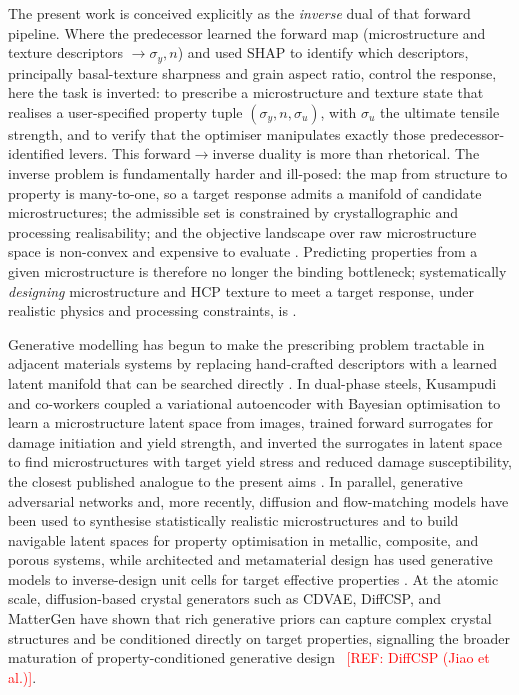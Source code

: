 \documentclass[preprint,12pt]{elsarticle}
\newcommand{\refneeded}[1]{\textcolor{red}{[REF: #1]}} %
\begin{document}
The present work is conceived explicitly as the \emph{inverse} dual of that forward pipeline. Where the predecessor learned the forward map (microstructure and texture descriptors $\rightarrow \sigma_y, n$) and used SHAP to identify which descriptors, principally basal-texture sharpness and grain aspect ratio, control the response, here the task is inverted: to prescribe a microstructure and texture state that realises a user-specified property tuple $(\sigma_y, n, \sigma_u)$, with $\sigma_u$ the ultimate tensile strength, and to verify that the optimiser manipulates exactly those predecessor-identified levers. This forward$\rightarrow$inverse duality is more than rhetorical. The inverse problem is fundamentally harder and ill-posed: the map from structure to property is many-to-one, so a target response admits a manifold of candidate microstructures; the admissible set is constrained by crystallographic and processing realisability; and the objective landscape over raw microstructure space is non-convex and expensive to evaluate \cite{GENERALE2024119877}. Predicting properties from a given microstructure is therefore no longer the binding bottleneck; systematically \emph{designing} microstructure and HCP texture to meet a target response, under realistic physics and processing constraints, is {\color{red}\cite{Kusampudi-Diehl-2023,CoPiLOT2026}}.

Generative modelling has begun to make the prescribing problem tractable in adjacent materials systems by replacing hand-crafted descriptors with a learned latent manifold that can be searched directly \cite{gomez2018}. In dual-phase steels, Kusampudi and co-workers coupled a variational autoencoder with Bayesian optimisation to learn a microstructure latent space from images, trained forward surrogates for damage initiation and yield strength, and inverted the surrogates in latent space to find microstructures with target yield stress and reduced damage susceptibility, the closest published analogue to the present aims \cite{Kusampudi-Diehl-2023,Kusampudi-thesis-2024}. In parallel, generative adversarial networks and, more recently, diffusion and flow-matching models have been used to synthesise statistically realistic microstructures and to build navigable latent spaces for property optimisation in metallic, composite, and porous systems, while architected and metamaterial design has used generative models to inverse-design unit cells for target effective properties \cite{Yang-GAN-microstructure-2018,cang2018,Metamaterial-InvDesign-2025,Metamaterial-InvDesign-2023,HENKES2022115497}. At the atomic scale, diffusion-based crystal generators such as CDVAE, DiffCSP, and MatterGen have shown that rich generative priors can capture complex crystal structures and be conditioned directly on target properties, signalling the broader maturation of property-conditioned generative design \cite{Generative-crystal-review,CDVAE-2022,MatterGen-2024}~\refneeded{DiffCSP (Jiao et al.)}.
\end{document}
